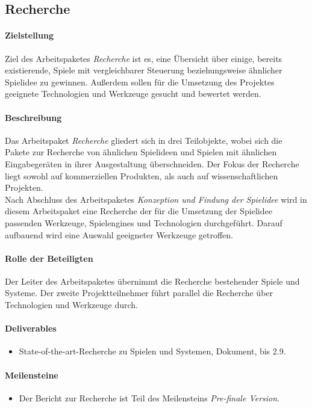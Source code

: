 \subsection{Recherche}

\paragraph{Zielstellung}\noindent
Ziel des Arbeitspaketes \textit{Recherche} ist es, eine Übersicht über einige, bereits existierende, Spiele mit vergleichbarer Steuerung beziehungsweise ähnlicher Spielidee zu gewinnen. Außerdem sollen für die Umsetzung des Projektes geeignete Technologien und Werkzeuge gesucht und bewertet werden.

\paragraph{Beschreibung}\noindent
Das Arbeitspaket \textit{Recherche} gliedert sich in drei Teilobjekte, wobei sich die Pakete zur Recherche von ähnlichen Spielideen und Spielen mit ähnlichen Eingabegeräten in ihrer Ausgestaltung überschneiden. Der Fokus der Recherche liegt sowohl auf kommerziellen Produkten, als auch auf wissenschaftlichen Projekten.\\
Nach Abschluss des Arbeitspaketes \textit{Konzeption und Findung der Spielidee} wird in diesem Arbeitspaket eine Recherche der für die Umsetzung der Spielidee passenden Werkzeuge, Spielengines und Technologien durchgeführt. Darauf aufbauend wird eine Auswahl geeigneter Werkzeuge getroffen.

\paragraph{Rolle der Beteiligten}\noindent
Der Leiter des Arbeitspaketes übernimmt die Recherche bestehender Spiele und Systeme. Der zweite Projektteilnehmer führt parallel die Recherche über Technologien und Werkzeuge durch.

\paragraph{Deliverables}\noindent
\begin{itemize}
\item State-of-the-art-Recherche zu Spielen und Systemen, Dokument, bis 2.9.
\end{itemize}

\paragraph{Meilensteine}\noindent
\begin{itemize}
\item Der Bericht zur Recherche ist Teil des Meilensteins \textit{Pre-finale Version}.
\end{itemize}

